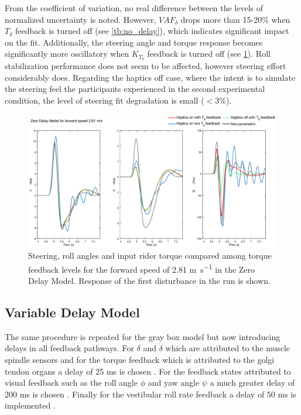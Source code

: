 From the coefficient of variation, no real difference between the levels of normalized uncertainty is noted. However, \ensuremath{\mathit{VAF}_\delta} drops more than 15-20\% when \ensuremath{T_\delta} feedback is turned off (see \cref{tb:no_delay}), which indicates significant impact on the fit. Additionally,  the steering angle and torque response   becomes significantly more oscillatory when \ensuremath{K_{T_\delta}} feedback is turned off (see \cref{fig:paper6}). Roll stabilization performance does not seem to be affected, however steering effort considerably does. Regarding the haptics off case, where the intent is to simulate the steering feel the participants experienced in the second experimental condition, the level of steering fit degradation is small (\ensuremath{<3\%}).

\begin{figure}[!h]
    \centering
    \captionsetup{justification=centering,margin=2cm}

    \includegraphics[width=\textwidth]{images/fb_compare_plots/no_delay_fb_compare28.eps}
    \caption{Steering, roll angles and input rider torque compared among torque feedback levels  for the forward speed of 2.81 \si{\meter\per\second} in the Zero Delay Model. Response of the first disturbance in the run is shown.}
    \label{fig:paper6}
\end{figure}



\subsection{Variable Delay Model}
The same procedure is repeated for the gray box model but now introducing  delays in all feedback pathways. For \ensuremath{\delta} and \ensuremath{\dot{\delta}} which are attributed to the muscle spindle sensors and for the torque feedback which is attributed to the golgi tendon organs  a delay of 25 \si{\milli\second} is chosen \cite{van2002identification,de2002adaptation}. For the feedback states attributed to visual feedback such as the roll angle \ensuremath{\phi} and yaw angle \ensuremath{\psi} a much greater delay of 200 \si{\milli\second} is chosen \cite{kawakami2002visual}. Finally for  the vestibular roll rate feedback a delay of 50 \si{\milli\second} is implemented \cite{barnett2013vestibular}. 

